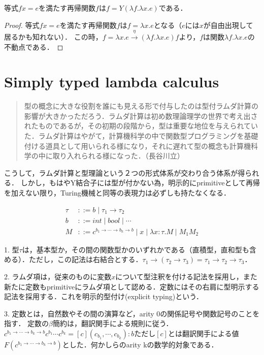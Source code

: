 \documentclass[uplatex, 12pt, dvipdfmx]{jsreport}
\begin{document}
\begin{proposition}
    等式$fx=e$を満たす再帰関数$f$は$f=Y(\lambda f.\lambda x.e)$である．
\end{proposition}
\begin{proof}
    等式$fx=e$を満たす再帰関数$f$は$f=\lambda x.e$となる（$e$には$x$が自由出現して居るかも知れない）．
    この時，$f=\lambda x.e\xrightarrow{\eta}(\lambda f.\lambda x.e)f$より，$f$は関数$\lambda f.\lambda x.e$の不動点である．
\end{proof}

\section{Simply typed lambda calculus}
\begin{quotation}
    型の概念に大きな役割を誰にも見える形で付与したのは型付ラムダ計算の影響が大きかっただろう．ラムダ計算は初め数理論理学の世界で考え出されたものであるが，その初期の段階から，型は重要な地位を与えられていた．ラムダ計算はやがて，計算機科学の中で関数型プログラミングを基礎付ける道具として用いられる様になり，それに遅れて型の概念も計算機科学の中に取り入れられる様になった．（長谷川立）
\end{quotation}
こうして，ラムダ計算と型理論という２つの形式体系が交わり合う体系が得られる．
しかし，もはやY結合子には型が付かない為，明示的にprimitiveとして再帰を加えない限り，Turing機械と同等の表現力は必ずしも持たなくなる．

\begin{shadebox}
    \begin{definition}[明示的に型付けされた単純型付きラムダ計算]
        \begin{align*}
            \tau &::= b\mid \tau_1\to\tau_2\\
            b &::= int\mid bool\mid\cdots \\
            M &::= c^{b_1\to\cdots\to b_k\to b}\mid x\mid \lambda x:\tau.M\mid M_1M_2
        \end{align*}
    \end{definition}
    \begin{remark}
        1. 型$\tau$は，基本型か，その間の関数型かのいずれかである（直積型，直和型も含める）．ただし，この記法は右結合とする．$\tau_1\to(\tau_2\to\tau_3)=\tau_1\to\tau_2\to\tau_3$．

        2. ラムダ項は，従来のものに変数$x$について型注釈を付ける記法を採用し，また新たに定数もprimitiveにラムダ項として認める．定数にはその右肩に型明示する記法を採用する．これを明示的型付け(explicit typing)という．

        3. 定数とは，自然数やその間の演算など，arity 0の関係記号や関数記号のことを指す．
        定数の$\beta$簡約は，翻訳関手による規則に従う．$c^{b_1\to\cdots\to b_k\to b}c^{b_1}\cdots c^{b_k}=[c](c_{b_1},\cdots,c_{b_k}):b$ただし$[c]$とは翻訳関手による値$F(c^{b_1\to\cdots\to b_k\to b})$とした．何かしらのarity kの数学的対象である．
    \end{remark}
\end{shadebox}
\end{document}
